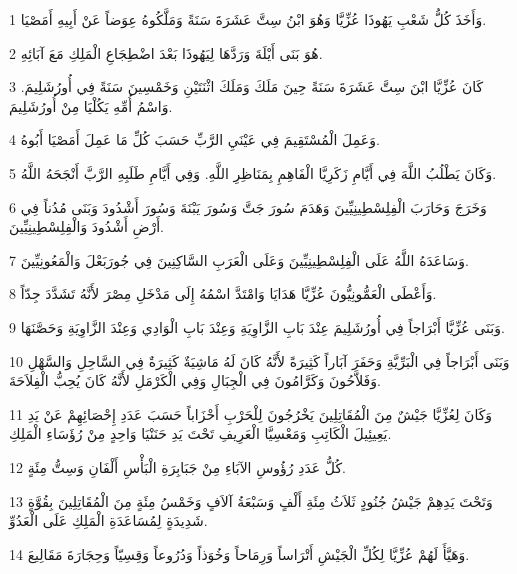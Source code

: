 \par 1 وَأَخَذَ كُلُّ شَعْبِ يَهُوذَا عُزِّيَّا وَهُوَ ابْنُ سِتَّ عَشَرَةَ سَنَةً وَمَلَّكُوهُ عِوَضاً عَنْ أَبِيهِ أَمَصْيَا.
\par 2 هُوَ بَنَى أَيْلَةَ وَرَدَّهَا لِيَهُوذَا بَعْدَ اضْطِجَاعِ الْمَلِكِ مَعَ آبَائِهِ.
\par 3 كَانَ عُزِّيَّا ابْنَ سِتَّ عَشَرَةَ سَنَةً حِينَ مَلَكَ وَمَلَكَ اثْنَتَيْنِ وَخَمْسِينَ سَنَةً فِي أُورُشَلِيمَ. وَاسْمُ أُمِّهِ يَكُلْيَا مِنْ أُورُشَلِيمَ.
\par 4 وَعَمِلَ الْمُسْتَقِيمَ فِي عَيْنَيِ الرَّبِّ حَسَبَ كُلِّ مَا عَمِلَ أَمَصْيَا أَبُوهُ.
\par 5 وَكَانَ يَطْلُبُ اللَّهَ فِي أَيَّامِ زَكَرِيَّا الْفَاهِمِ بِمَنَاظِرِ اللَّهِ. وَفِي أَيَّامِ طَلَبِهِ الرَّبَّ أَنْجَحَهُ اللَّهُ.
\par 6 وَخَرَجَ وَحَارَبَ الْفِلِسْطِينِيِّينَ وَهَدَمَ سُورَ جَتَّ وَسُورَ يَبْنَةَ وَسُورَ أَشْدُودَ وَبَنَى مُدُناً فِي أَرْضِ أَشْدُودَ وَالْفِلِسْطِينِيِّينَ.
\par 7 وَسَاعَدَهُ اللَّهُ عَلَى الْفِلِسْطِينِيِّينَ وَعَلَى الْعَرَبِ السَّاكِنِينَ فِي جُورَبَعْلَ وَالْمَعُونِيِّينَ.
\par 8 وَأَعْطَى الْعَمُّونِيُّونَ عُزِّيَّا هَدَايَا وَامْتَدَّ اسْمُهُ إِلَى مَدْخَلِ مِصْرَ لأَنَّهُ تَشَدَّدَ جِدّاً.
\par 9 وَبَنَى عُزِّيَّا أَبْرَاجاً فِي أُورُشَلِيمَ عِنْدَ بَابِ الزَّاوِيَةِ وَعِنْدَ بَابِ الْوَادِي وَعِنْدَ الزَّاوِيَةِ وَحَصَّنَهَا.
\par 10 وَبَنَى أَبْرَاجاً فِي الْبَرِّيَّةِ وَحَفَرَ آبَاراً كَثِيرَةً لأَنَّهُ كَانَ لَهُ مَاشِيَةٌ كَثِيرَةٌ فِي السَّاحِلِ وَالسَّهْلِ وَفَلاَّحُونَ وَكَرَّامُونَ فِي الْجِبَالِ وَفِي الْكَرْمَلِ لأَنَّهُ كَانَ يُحِبُّ الْفِلاَحَةَ.
\par 11 وَكَانَ لِعُزِّيَّا جَيْشٌ مِنَ الْمُقَاتِلِينَ يَخْرُجُونَ لِلْحَرْبِ أَحْزَاباً حَسَبَ عَدَدِ إِحْصَائِهِمْ عَنْ يَدِ يَعِيئِيلَ الْكَاتِبِ وَمَعْسِيَّا الْعَرِيفِ تَحْتَ يَدِ حَنَنْيَا وَاحِدٍ مِنْ رُؤَسَاءِ الْمَلِكِ.
\par 12 كُلُّ عَدَدِ رُؤُوسِ الآبَاءِ مِنْ جَبَابِرَةِ الْبَأْسِ أَلْفَانِ وَسِتُّ مِئَةٍ.
\par 13 وَتَحْتَ يَدِهِمْ جَيْشُ جُنُودٍ ثَلاَثُ مِئَةِ أَلْفٍ وَسَبْعَةُ آلاَفٍ وَخَمْسُ مِئَةٍ مِنَ الْمُقَاتِلِينَ بِقُوَّةٍ شَدِيدَةٍ لِمُسَاعَدَةِ الْمَلِكِ عَلَى الْعَدُوِّ.
\par 14 وَهَيَّأَ لَهُمْ عُزِّيَّا لِكُلِّ الْجَيْشِ أَتْرَاساً وَرِمَاحاً وَخُوَذاً وَدُرُوعاً وَقِسِيّاً وَحِجَارَةَ مَقَالِيعَ.
